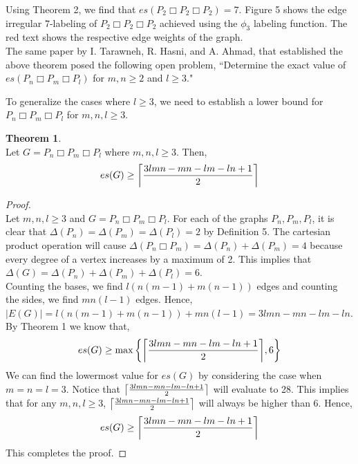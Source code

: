 \documentclass[12pt, a4paper]{report}
\newlength\tindent
\renewcommand{\indent}{\hspace*{\tindent}}
\DeclarePairedDelimiter{\ceil}{\lceil}{\rceil}
\theoremstyle{definition}
\theoremstyle{definition}
\newtheorem{theorem}{Theorem}
\theoremstyle{remark}
\theoremstyle{definition}
\theoremstyle{definition}
\begin{document}
\indent Using Theorem 2, we find that $es(P_2\Box P_2\Box P_2) = 7$. Figure 5 shows the edge irregular $7$-labeling of $P_2\Box P_2\Box P_2$ achieved using the $\phi_3$ labeling function. The red text shows the respective edge weights of the graph.\\

\indent The same paper by I. Tarawneh, R. Hasni, and A. Ahmad, that established the above theorem posed the following open problem, “Determine the exact value of $es(P_n\Box P_m\Box P_l)$ for $m,n\geq2$ and $l\geq3$."

\newpage
To generalize the cases where $l\geq3$, we need to establish a lower bound for $P_n\Box P_m\Box P_l$ for $m,n,l\geq3$.

\begin{theorem}
\ \\\indent Let $G=P_n\Box P_m\Box P_l$ where $m,n,l\geq 3$. Then,
\begin{equation*}
	es(G)\geq \ceil[\bigg ]{\frac{3lmn-mn-lm-ln+1}{2}}
\end{equation*}
\end{theorem}

\begin{proof}
\ \\\indent Let $m,n,l\geq3$ and $G=P_n\Box P_m\Box P_l$. For each of the graphs $P_n, P_m, P_l$, it is clear that $\Delta(P_n)=\Delta(P_m)=\Delta(P_l)=2$ by Definition 5. The cartesian product operation will cause $\Delta(P_n\Box P_m)=\Delta(P_n) + \Delta(P_m) = 4$ because every degree of a vertex increases by a maximum of 2. This implies that $\Delta(G) = \Delta(P_n) + \Delta(P_m) + \Delta(P_l) = 6$.\\
\indent Counting the bases, we find $l(n(m-1) + m(n-1))$ edges and counting the sides, we find $mn(l-1)$ edges. Hence, $|E(G)| = l(n(m-1) + m(n-1)) + mn(l-1) = 3lmn - mn - lm - ln$.\\
\indent By Theorem 1 we know that,
\begin{equation*}
	es(G) \geq \max \bigg\{ \ceil[\bigg ]{\frac{3lmn - mn - lm - ln + 1}{2}}, 6 \bigg\}
\end{equation*}
\indent We can find the lowermost value for $es(G)$ by considering the case when $m=n=l=3$. Notice that $\ceil[\big ]{\frac{3lmn - mn - lm - ln + 1}{2}}$ will evaluate to 28. This implies that for any $m,n,l\geq3$, $\ceil[\big ]{\frac{3lmn - mn - lm - ln + 1}{2}}$ will always be higher than $6$. Hence,
\begin{equation*}
	es(G)\geq \ceil[\bigg ]{\frac{3lmn-mn-lm-ln+1}{2}}
\end{equation*}
This completes the proof.
\end{proof}
\end{document}
